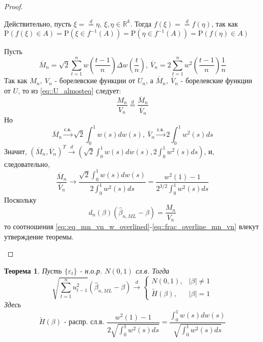 \documentclass[12pt]{article}
\newtheorem{theorem}{Теорема}
\def\eps{ \varepsilon }
\def\R{ \mathbb{R} }
\def\P{ \mathrm{P} }
\begin{document}
\begin{proof}
\begin{enumerate}
\begin{leftbar}
            Действительно, пусть $\xi=\overset{d}{=}\eta,\ \xi,\eta\in\R^k$. Тогда $f(\xi)=\overset{d}{=}f(\eta)$,
            так как $\P(f(\xi)\in A)=\P(\xi\in f^{-1}(A))=\P(\eta\in f^{-1}(A))=\P(f(\eta)\in A)$
        \end{leftbar}
        Пусть
        \[\overline{M}_n=\sqrt{2}\sum_{t=1}^nw\left(\frac{t-1}{n}\right)\Delta w\left(\frac{t}{n}\right),\ \overline{V}_n=2\sum_{t=1}^nw^2\left(\frac{t-1}{n}\right)\frac{1}{n}\]
        Так как $M_n,\ V_n$ - борелевские функции от $U_n$, а $\overline{M}_n,\ \overline{V}_n$ - борелевские функции от $U$,
        то из \eqref{eq::U_almosteq} следует:
        \begin{equation}\label{eq::eq_mn_vn_w_overlined}
            \frac{M_n}{V_n}\overset{d}{=}\frac{\overline{M}_n}{\overline{V}_n}
        \end{equation}
        Но
        \[\overline{M}_n\xrightarrow{\text{с.к.}}\sqrt{2}\int_0^1w(s)dw(s),\ \overline{V}_n\xrightarrow{\text{с.к.}}2\int_0^1w^2(s)ds\]
        Значит, $(\overline{M}_n,\overline{V}_n)^T\xrightarrow{d}\left(\sqrt{2}\int_0^1w(s)dw(s), 2\int_0^1w^2(s)ds\right)$,
        и, следовательно,
        \begin{equation}\label{eq::frac_overline_mn_vn}
            \frac{\overline{M}_n}{\overline{V}_n}\rightarrow\frac{\sqrt{2}\int_0^1w(s)dw(s)}{2\int_0^1w^2(s)ds}=\frac{w^2(1)-1}{2^{3/2}\int^1_0w^2(s)ds}
        \end{equation}
        Поскольку
        \[d_n(\beta)(\widehat{\beta}_{n,ML}-\beta)=\frac{M_n}{V_n}\]
        то соотношения \eqref{eq::eq_mn_vn_w_overlined}-\eqref{eq::frac_overline_mn_vn} влекут утверждение
        теоремы.
    \end{enumerate}
\end{proof}
\begin{theorem}
    Пусть $\{\eps_t\}$ - н.о.р. $N(0,1)$ сл.в. Тогда
    \[\sqrt{\sum_{t=1}^nu^2_{t-1}}(\widehat{\beta}_{n,ML}-\beta)\xrightarrow{d}\begin{cases}
        N(0,1),& \left\lvert \beta\right\rvert \neq1\\
        \widetilde{H}(\beta),& \left\lvert \beta\right\rvert =1
    \end{cases}\]
    Здесь
    \[\widetilde{H}(\beta)\text{ - распр. сл.в. }\frac{w^2(1)-1}{2\sqrt{\int_0^1w^2(s)ds}}=\frac{\int_0^1w(s)dw(s)}{\sqrt{\int^1_0w^2(s)ds}}\]
\end{theorem}
\end{document}
